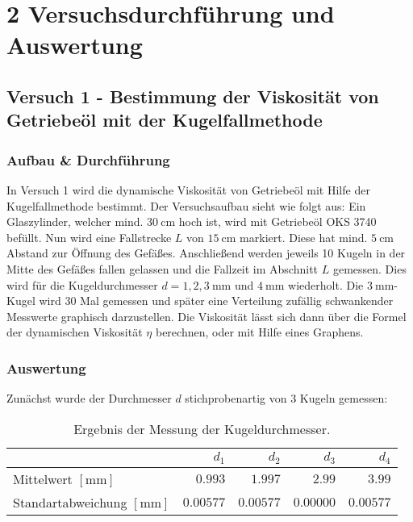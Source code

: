 \chapter*{2 Versuchsdurchführung und Auswertung}
\setcounter{chapter}{2}
\setcounter{section}{0}
\setcounter{subsection}{0}
 
    \section{Versuch 1 - Bestimmung der Viskosität von Getriebeöl mit der Kugelfallmethode}
    \label{sec:Versuch1}
        
        \subsection{Aufbau \& Durchführung}

            In Versuch 1 wird die dynamische Viskosität von Getriebeöl mit Hilfe der Kugelfallmethode bestimmt. Der Versuchsaufbau sieht wie folgt aus:
            Ein Glaszylinder, welcher mind. $30\ \mathrm{cm}$ hoch ist, wird mit Getriebeöl OKS 3740 befüllt. Nun wird eine Fallstrecke $L$ von $15\ \mathrm{cm}$ markiert. Diese hat mind. $5\ \mathrm{cm}$ Abstand zur Öffnung des Gefäßes. Anschließend werden jeweils 10 Kugeln in der Mitte des Gefäßes fallen gelassen und die Fallzeit im Abschnitt $L$ gemessen. Dies wird für die Kugeldurchmesser $d = 1, 2, 3\ \mathrm{mm}$ und $4\ \mathrm{mm}$ wiederholt. Die $3\ \mathrm{mm}$-Kugel wird 30 Mal gemessen und später eine Verteilung zufällig schwankender Messwerte graphisch darzustellen.
            Die Viskosität lässt sich dann über die Formel der dynamischen Viskosität $\eta$ berechnen, oder mit Hilfe eines Graphens.

        \subsection{Auswertung}

            Zunächst wurde der Durchmesser $d$ stichprobenartig von $3$ Kugeln gemessen:

            \begin{table}[H]
                \centering
                \begin{tabular}{|l||r||r|r|r|}
                    \hline
                    & $d_{1}$ & $d_{2}$ & $d_{3}$ & $d_{4}$\\
                    \hline \hline
                    Mittelwert $[\mathrm{mm}]$ & $0.993$ & $1.997$ & $2.99$ & $3.99$\\
                    Standartabweichung $[\mathrm{mm}]$ & $0.00577$ & $0.00577$ & $0.00000$ & $0.00577$\\
                    \hline
                \end{tabular}
                \caption{Ergebnis der Messung der Kugeldurchmesser.}
                \label{tab:MesswerteDurchmesser}
            \end{table}

